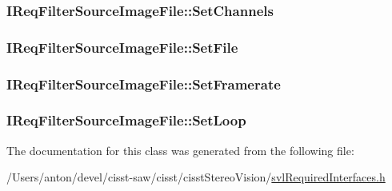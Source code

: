 \subsubsection[{Set\+Channels}]{ I\+Req\+Filter\+Source\+Image\+File\+::\+Set\+Channels}\label{class_i_req_filter_source_image_file_a277fb1f67abe840dca507ed8caebc051}
\hypertarget{class_i_req_filter_source_image_file_acbcd51d212dee25261263e552040eb4f}{}
\subsubsection[{Set\+File}]{ I\+Req\+Filter\+Source\+Image\+File\+::\+Set\+File}\label{class_i_req_filter_source_image_file_acbcd51d212dee25261263e552040eb4f}
\hypertarget{class_i_req_filter_source_image_file_a9195480b969ae523fe65ce266895bd21}{}
\subsubsection[{Set\+Framerate}]{ I\+Req\+Filter\+Source\+Image\+File\+::\+Set\+Framerate}\label{class_i_req_filter_source_image_file_a9195480b969ae523fe65ce266895bd21}
\hypertarget{class_i_req_filter_source_image_file_a6c0b3f702b2fe002ad47838d9e6d71cb}{}
\subsubsection[{Set\+Loop}]{ I\+Req\+Filter\+Source\+Image\+File\+::\+Set\+Loop}\label{class_i_req_filter_source_image_file_a6c0b3f702b2fe002ad47838d9e6d71cb}


The documentation for this class was generated from the following file\+:\begin{DoxyCompactItemize}
\item 
/\+Users/anton/devel/cisst-\/saw/cisst/cisst\+Stereo\+Vision/\hyperlink{svl_required_interfaces_8h}{svl\+Required\+Interfaces.\+h}\end{DoxyCompactItemize}
